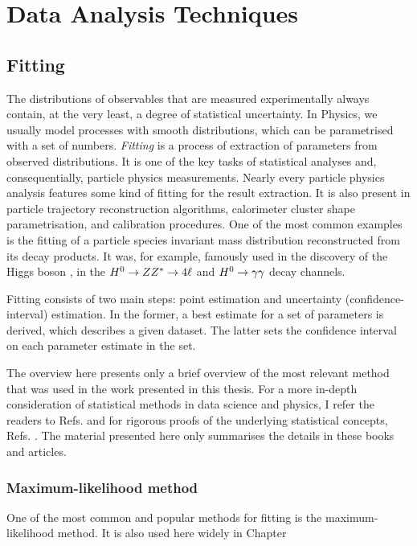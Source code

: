 \chapter{Data Analysis Techniques}

\section{Fitting}\label{sec:fitting}

The distributions of observables that are measured experimentally always contain, at the very least, a degree of statistical uncertainty.
In Physics, we usually model processes with smooth distributions, which can be parametrised with a set of numbers. 
\textit{Fitting} is a process of extraction of parameters from observed distributions. 
It is one of the key tasks of statistical analyses and, consequentially, particle physics measurements. 
Nearly every particle physics analysis features some kind of fitting for the result extraction. 
It is also present in particle trajectory reconstruction algorithms, calorimeter cluster shape parametrisation, and calibration procedures.
One of the most common examples is the fitting of a particle species invariant mass distribution reconstructed from its decay products.
It was, for example, famously used in the discovery of the Higgs boson \cite{ATLAS:2012yve,CMS:2012qbp}, in the  $H^0\rightarrow ZZ^{*}\rightarrow 4\ell$ and $H^0\rightarrow\gamma\gamma$ decay channels.

Fitting consists of two main steps: point estimation and uncertainty (confidence-interval) estimation. 
In the former, a best estimate for a set of parameters is derived, which describes a given dataset.
The latter sets the confidence interval on each parameter estimate in the set. 

The overview here presents only a brief overview of the most relevant method that was used in the work presented in this thesis. 
For a more in-depth consideration of statistical methods in data science and physics, I refer the readers to Refs. \cite{Behnke:2013pga,Blobel_Lohrmann_1998} and for rigorous proofs of the underlying statistical concepts, Refs. \cite{Bohm:2014vmk,James_2006,Barlow:1990vc}. 
The material presented here only summarises the details in these books and articles.
\subsection{Maximum-likelihood method}\label{sec:mle}

One of the most common and popular methods for fitting is the maximum-likelihood method. It is also used here widely in Chapter 

